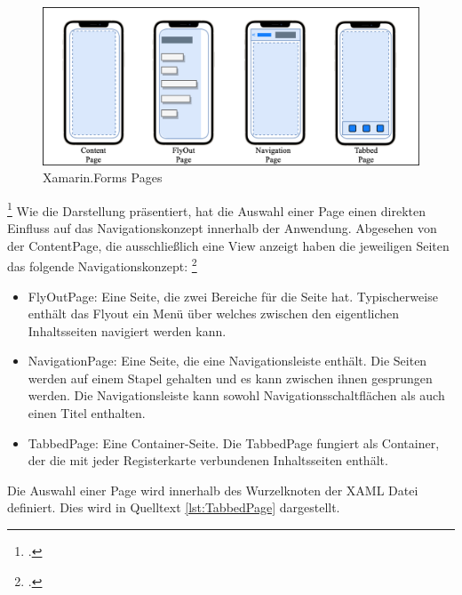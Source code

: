 \begin{figure}[!ht]
 \includegraphics[width=\textwidth,height=\textheight,keepaspectratio]{Images/CrossPlattformFrameworks/XamarinFormsPages.png}
 \caption[Xamarin.Forms Pages]{Xamarin.Forms Pages\footnotemark}
 \label{fig:Xamarin.Forms Pages}
\end{figure}
\footcitetext[Abbildung in Anlehnung an ][Abgerufen am \today]{MicrosoftXamPages2016}
Wie die Darstellung präsentiert, hat die Auswahl einer Page einen direkten Einfluss auf das Navigationskonzept innerhalb der Anwendung.  Abgesehen von der ContentPage, die ausschließlich eine View anzeigt haben die jeweiligen Seiten das folgende Navigationskonzept: \footcite[Vgl.][Abgerufen am \today]{MicrosoftXamPages2016}

\begin{itemize}
\setlength\itemsep{-0.6em}
 \item FlyOutPage: Eine Seite, die zwei Bereiche für die Seite hat. Typischerweise enthält das Flyout ein Menü über welches zwischen den eigentlichen Inhaltsseiten navigiert werden kann.
 \item NavigationPage: Eine Seite,  die eine Navigationsleiste enthält.  Die Seiten werden auf einem Stapel gehalten und es kann zwischen ihnen gesprungen werden.  Die Navigationsleiste kann sowohl Navigationsschaltflächen als auch einen Titel enthalten.
 \item TabbedPage: Eine Container-Seite.  Die TabbedPage fungiert als Container,  der die mit jeder Registerkarte verbundenen Inhaltsseiten enthält.
\end{itemize}

Die Auswahl einer Page wird innerhalb des Wurzelknoten der XAML Datei definiert.  Dies wird in Quelltext \ref{lst:TabbedPage} dargestellt. 

\begin{minipage}{\linewidth}

\end{minipage}

